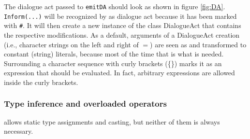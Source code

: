 
The dialogue act passed to \texttt{emitDA} should look as shown in figure \ref{fig:DA}. \texttt{Inform}\verb|(...)| will be recognized by \vonda as dialogue act because it has been marked with \verb|#|. It will then create a new instance of the class DialogueAct that contains the respective modifications. As a default, arguments of a DialogueAct creation (i.e., character strings on the left and right of $=$) are seen as and transformed to constant (string) literals, because most of the time that is what is needed.
Surrounding a character sequence with curly brackets (\{\}) marks it as an
expression that should be evaluated. In fact, arbitrary expressions are allowed
inside the curly brackets.

\subsubsection{Type inference and overloaded operators}
\label{sec:typeinference}

%
\vonda allows static type assignments and casting, but neither of them is always necessary.


